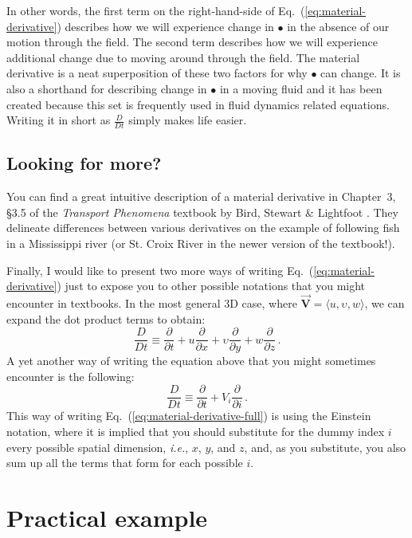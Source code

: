 In other words, the first term on the right-hand-side of Eq.~(\ref{eq:material-derivative}) describes how we will experience change in $\bullet$ in the absence of our motion through the field. The second term describes how we will experience additional change due to moving around through the field. The material derivative is a neat superposition of these two factors for why $\bullet$ can change. It is also a shorthand for describing change in $\bullet$ in a moving fluid and it has been created because this set is frequently used in fluid dynamics related equations. Writing it in short as $\frac{D}{D t}$ simply makes life easier.

\begin{mdframed}[style=exercise-frame]

\subsection*{Looking for more?}

You can find a great intuitive description of a material derivative in Chapter~3, \S3.5 of the \textit{Transport Phenomena} textbook by Bird, Stewart \& Lightfoot \cite{bird2002transport}. They delineate differences between various derivatives on the example of following fish in a Mississippi river (or St. Croix River in the newer version of the textbook!).

\end{mdframed}

Finally, I would like to present two more ways of writing Eq.~(\ref{eq:material-derivative}) just to expose you to other possible notations that you might encounter in textbooks. 
In the most general 3D case, where $\vec{\bm{V}} = \langle u, \upsilon, w \rangle$, we can expand the dot product terms to obtain:
\begin{equation} \label{eq:material-derivative-full}
\frac{D}{D t} \equiv \frac{\partial}{\partial t} + u \frac{\partial}{\partial x} + \upsilon \frac{\partial}{\partial y} + w \frac{\partial}{\partial z} \, .
\end{equation}
A yet another way of writing the equation above that you might sometimes encounter is the following:
\begin{equation} \label{eq:material-derivative-ein stein}
\frac{D}{D t} \equiv \frac{\partial}{\partial t} + V_i \frac{\partial}{\partial i} \, .
\end{equation}
This way of writing Eq.~(\ref{eq:material-derivative-full}) is using the Einstein notation, where it is implied that you should substitute for the dummy index $i$ every possible spatial dimension, \textit{i.e.}, $x$, $y$, and $z$, and, as you substitute, you also sum up all the terms that form for each possible $i$.






\section{Practical example}



